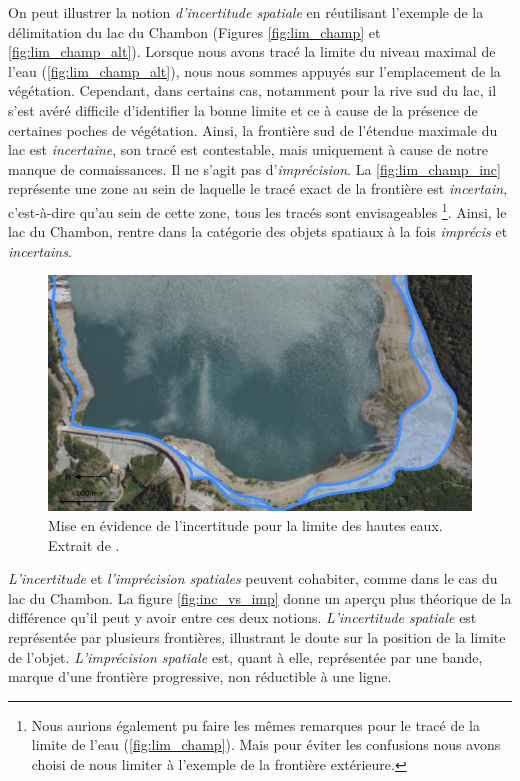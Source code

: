 On peut illustrer la notion \emph{d’incertitude spatiale} en
réutilisant l’exemple de la délimitation du lac du Chambon (Figures
\ref{fig:lim_champ} et \ref{fig:lim_champ_alt}). Lorsque nous avons
tracé la limite du niveau maximal de l’eau
(\autoref{fig:lim_champ_alt}), nous nous sommes appuyés sur
l’emplacement de la végétation. Cependant, dans certains cas,
notamment pour la rive sud du lac, il s’est avéré difficile
d’identifier la bonne limite et ce à cause de la présence de certaines
poches de végétation. Ainsi, la frontière sud de l’étendue maximale du
lac est \emph{incertaine}, son tracé est contestable, mais uniquement
à cause de notre manque de connaissances. Il ne s’agit pas
d’\emph{imprécision}. La \autoref{fig:lim_champ_inc} représente une
zone au sein de laquelle le tracé exact de la frontière est
\emph{incertain}, c’est-à-dire qu’au sein de cette zone, tous les
tracés sont envisageables \footnote{Nous aurions également pu faire
  les mêmes remarques pour le tracé de la limite de l’eau
  (\autoref{fig:lim_champ}). Mais pour éviter les confusions nous
  avons choisi de nous limiter à l’exemple de la frontière
  extérieure.}. Ainsi, le lac du Chambon, rentre dans la catégorie des
objets spatiaux à la fois \emph{imprécis} et \emph{incertains}.

\begin{figure}
  \centering
  \includegraphics{../figures/fig4.png}
  \caption{Mise en évidence de l'incertitude pour la limite des hautes
    eaux. Extrait de \textcite{Bunel2020}.}
  \label{fig:lim_champ_inc}
\end{figure}

\emph{L’incertitude} et \emph{l’imprécision spatiales} peuvent
cohabiter, comme dans le cas du lac du Chambon. La figure
\ref{fig:inc_vs_imp} donne un aperçu plus théorique de la différence
qu’il peut y avoir entre ces deux notions. \emph{L’incertitude
  spatiale} est représentée par plusieurs frontières, illustrant le
doute sur la position de la limite de l’objet. \emph{L’imprécision
  spatiale} est, quant à elle, représentée par une bande, marque d’une
frontière progressive, non réductible à une ligne.

